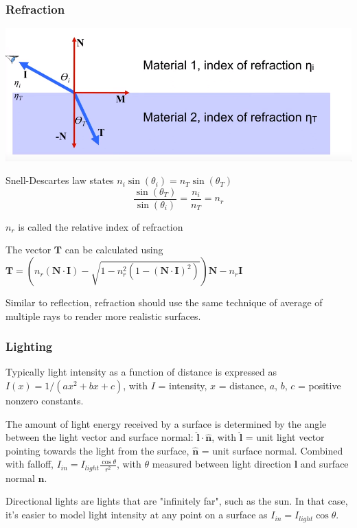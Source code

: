 \documentclass[12pt]{article}
\begin{document}
\subsubsection{Refraction}

\includegraphics[scale=.5]{images/refraction.png}

Snell-Descartes law states $n_i \sin(\theta_i) = n_T \sin(\theta_T)$
\[ \frac{\sin(\theta_T)}{\sin(\theta_i)} = \frac{n_i}{n_T} = n_r \]

$n_r$ is called the relative index of refraction

The vector $\bm T$ can be calculated using $\bm T = \left(n_r(\bm N \cdot
\bm I) - \sqrt{1 - n_r^2(1-(\bm N \cdot \bm I)^2)}\right) \bm N - n_r \bm I$

Similar to reflection, refraction should use the same technique of
average of multiple rays to render more realistic surfaces.

\subsubsection{Lighting}

Typically light intensity as a function of distance is expressed as
$I(x) = 1/(ax^2 + bx + c)$, with $I$ = intensity, $x$ = distance,
$a$, $b$, $c$ = positive nonzero constants.

The amount of light energy received by a surface is determined by
the angle between the light vector and surface normal: $\hat{\bm l}
\cdot \hat{\bm n}$, with $\hat{\bm l}$ = unit light vector pointing towards
the light from the surface, $\hat{\bm n}$ = unit surface normal. Combined
with falloff, $I_{in} = I_{light} \frac{\cos\theta}{r^2}$, with $\theta$
measured between light direction $\bm l$ and surface normal $\bm n$.

Directional lights are lights that are "infinitely far", such as the
sun. In that case, it's easier to model light intensity at any point
on a surface as $I_{in} = I_{light} \cos\theta$.
\end{document}
